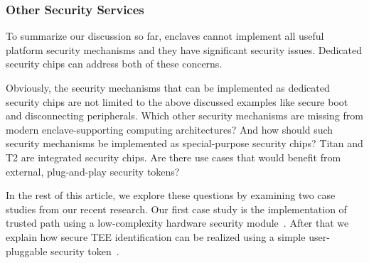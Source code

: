 \subsubsection*{Other Security Services}

To summarize our discussion so far, enclaves cannot implement all useful platform security mechanisms and they have significant security issues. Dedicated security chips can address both of these concerns. 

Obviously, the security mechanisms that can be implemented as dedicated security chips are not limited to the above discussed examples like secure boot and disconnecting peripherals. Which other security mechanisms are missing from modern enclave-supporting computing architectures? And how should such security mechanisms be implemented as special-purpose security chips? Titan and T2 are integrated security chips. Are there use cases that would benefit from external, plug-and-play security tokens?

In the rest of this article, we explore these questions by examining two case studies from our recent research. Our first case study is the implementation of trusted path using a low-complexity hardware security module~\cite{protection}. After that we explain how secure TEE identification can be realized using a simple user-pluggable security token~\cite{proximitee}.
